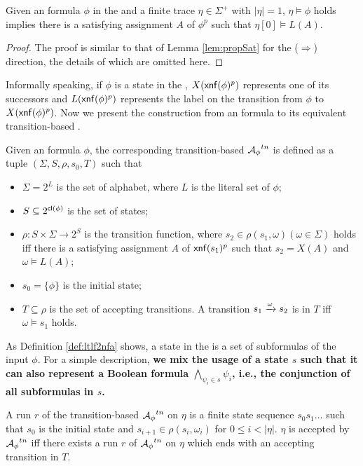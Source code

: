 \begin{corollary}\label{coro:propSat}
Given an \ltlf formula $\phi$ in the \XNF and a finite trace $\eta\in\Sigma^+$ with $|\eta|=1$, $\eta\models\phi$ holds implies there is a satisfying assignment $A$ of $\phi^p$ such that $\eta[0]\models L(A)$.
\end{corollary}
\begin{proof}
The proof is similar to that of Lemma \ref{lem:propSat} for the ($\Rightarrow$) direction, the details of which are omitted here.
\end{proof}
  
Informally speaking, if $\phi$ is a state in the \NFA, $X({\sf xnf}(\phi)^p)$ represents one of its successors and $L({\sf xnf}(\phi)^p)$ represents the label on the transition from $\phi$ to $X({\sf xnf}(\phi)^p)$. Now we present the construction from an \ltlf formula to its equivalent transition-based \NFA. 

   
\begin{definition}\label{def:ltlf2nfa} 
Given an \ltlf formula $\phi$, the corresponding transition-based \NFA ${\mathcal{A}_{\phi}}^{tn}$ is defined as a tuple $(\Sigma, S, \rho, s_0, T)$ such that
\begin{itemize}
	\item $\Sigma = 2^{L}$ is the set of alphabet, where $L$ is the literal set of $\phi$;
	\item $S\subseteq 2^{{\sf cl}(\phi)}$ is the set of states;
	\item $\rho:  S \times \Sigma \to 2^S$ is the transition function, where $s_2 \in \rho(s_1, \omega) (\omega \in \Sigma)$ holds iff there is a satisfying assignment $A$ of ${\sf xnf}(s_1)^p$ such that $s_2 = X(A)$ and $\omega\models L(A)$;
	\item $s_0 = \{\phi \}$ is the initial state;
	\item $T\subseteq \rho$ is the set of accepting transitions. A transition $s_1\xrightarrow[]{\omega}s_2$ is in $T$ iff $\omega\models s_1$ holds. 
\end{itemize}
\end{definition}

As Definition \ref{def:ltlf2nfa} shows, a state in the \NFA is a set of subformulas of the input $\phi$. For a simple description, \textbf{we mix the usage of a state $s$ such that it can also represent a Boolean formula $\bigwedge_{\psi_i\in s}\psi_i$, i.e., the conjunction of all subformulas in $s$.} 

A run $r$ of the transition-based \NFA ${\mathcal{A}_{\phi}}^{tn}$ on $\eta$ is a finite state sequence $s_0 s_1\ldots$ such that $s_0$ is the initial state and $s_{i+1}\in\rho(s_i,\omega_i)$ for $0\leq i < |\eta|$. $\eta$ is accepted by ${\mathcal{A}_{\phi}}^{tn}$ iff there exists a run $r$ of ${\mathcal{A}_{\phi}}^{tn}$ on $\eta$ which ends with an accepting transition in $T$. 


